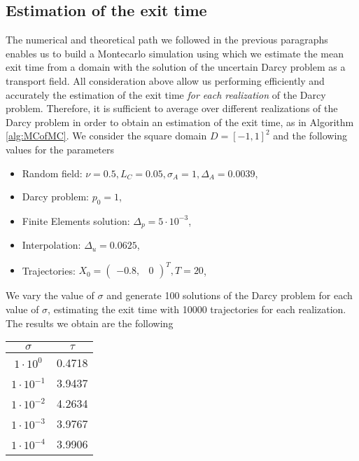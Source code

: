 \subsection{Estimation of the exit time}

The numerical and theoretical path we followed in the previous paragraphs enables us to build a Montecarlo simulation using which we estimate the mean exit time from a domain with the solution of the uncertain Darcy problem as a transport field. All consideration above allow us performing efficiently and accurately the estimation of the exit time \textit{for each realization} of the Darcy problem. Therefore, it is sufficient to average over different realizations of the Darcy problem in order to obtain an estimation of the exit time, as in Algorithm \ref{alg:MCofMC}. We consider the square domain $D = [-1, 1]^2$ and the following values for the parameters
\begin{itemize}
	\item Random field: $\nu = 0.5, L_C = 0.05, \sigma_A = 1, \Delta_A = 0.0039$,
	\item Darcy problem: $p_0 = 1$,
	\item Finite Elements solution: $\Delta_p = 5\cdot 10^{-3}$,
	\item Interpolation: $\Delta_u = 0.0625$,
	\item Trajectories: $X_0 = \begin{pmatrix} -0.8, & 0 \end{pmatrix}^T,  T = 20$,
\end{itemize}

\noindent We vary the value of $\sigma$ and generate 100 solutions of the Darcy problem for each value of $\sigma$, estimating the exit time with 10000 trajectories for each realization. The results we obtain are the following 

\begin{center}
 	\begin{tabular}{|c c|} 
 	\hline
 	$\sigma$ & $\tau$ \\ [0.5ex] 
 	\hline\hline
	$1\cdot10^0$ & 0.4718 \\ 
 	\hline
 	$1\cdot10^{-1}$ & 3.9437 \\
 	\hline
 	$1\cdot10^{-2}$ & 4.2634 \\
 	\hline
	$1\cdot10^{-3}$ & 3.9767 \\
	\hline
	$1\cdot10^{-4}$ & 3.9906 \\
	\hline
\end{tabular}
\end{center}

